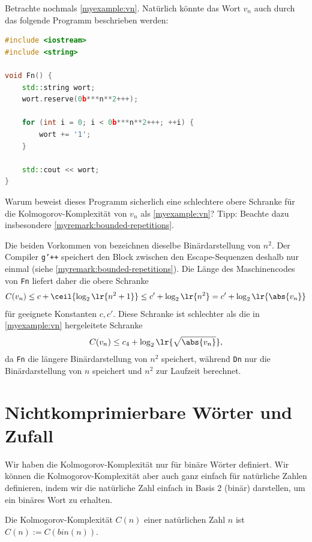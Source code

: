 \begin{myexercise}
	Betrachte nochmals \cref{myexample:vn}. Natürlich könnte das Wort $v_n$ auch durch das folgende Programm beschrieben werden:
	\begin{lstlisting}[language=C++,escapechar=!] 
#include <iostream>
#include <string>

void Fn() {
    std::string wort;
    wort.reserve(0b***n**2+++);

    for (int i = 0; i < 0b***n**2+++; ++i) {
        wort += '1';
    }

    std::cout << wort;
}
    \end{lstlisting}
	Warum beweist dieses Programm sicherlich eine schlechtere obere Schranke für die Kolmogorov-Komplexität von $v_n$ als \cref{myexample:vn}? Tipp: Beachte dazu insbesondere \cref{myremark:bounded-repetitions}.
	\begin{myanswer}
		Die beiden Vorkommen von  bezeichnen dieselbe Binärdarstellung von $n^2$. Der Compiler \texttt{g'++} speichert den Block zwischen den Escape-Sequenzen deshalb nur einmal (siehe \cref{myremark:bounded-repetitions}). Die Länge des Maschinencodes von \texttt{Fn} liefert daher die obere Schranke
		\begin{align*}
			C(v_n)\leq c + \ceil{\log_2\lr{n^2 + 1}} \leq c' + \log_2\lr{n^2} = c' + \log_2\lr{\abs{v_n}}
		\end{align*}
		für geeignete Konstanten $c, c'$. Diese Schranke ist schlechter als die in \cref{myexample:vn} hergeleitete Schranke
		\begin{align*}
			C(v_n)\leq c_4 + \log_2\lr{\sqrt{\abs{v_n}}},
		\end{align*}
		da \texttt{Fn} die längere Binärdarstellung von $n^2$ speichert, während \texttt{Dn} nur die Binärdarstellung von $n$ speichert und $n^2$ zur Laufzeit berechnet.
	\end{myanswer}
\end{myexercise}

\section{Nichtkomprimierbare Wörter und Zufall}
Wir haben die Kolmogorov-Komplexität nur für binäre Wörter definiert. Wir können die Kolmogorov-Komplexität aber auch ganz einfach für natürliche Zahlen definieren, indem wir die natürliche Zahl einfach in Basis 2 (binär) darstellen, um ein binäres Wort zu erhalten.

\begin{mydefinition}
Die Kolmogorov-Komplexität $C(n)$ einer natürlichen Zahl $n$ ist $C(n) := C(bin(n))$.
\end{mydefinition}

